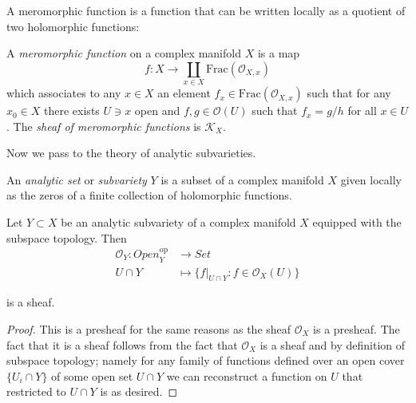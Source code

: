 \medskip\noindent
A meromorphic function is a function that
can be written locally as a quotient of two
holomorphic functions:

\begin{definition}
\label{definition-meromorphic-functions}
\begin{reference}
\cite[Definition 2.1.8]{huc}
\end{reference}
A {\it meromorphic function} on a complex manifold $X$ 
is a map
$$
f:X \to \coprod_{x \in X}\text{Frac}(\mathcal{O}_{X,x})
$$
which associates to any $x\in X$
an element $f_x \in \text{Frac}(\mathcal{O}_{X,x})$
such that for any $x_0 \in X$ 
there exists $U\ni x$ open and $f,g \in\mathcal{O}(U)$ 
such that $f_x=g/h$ for all $x \in U$.
The {\it sheaf of meromorphic functions} is $\mathcal{K}_X$.
\end{definition}


\medskip\noindent
Now we pass to the theory of analytic subvarieties.

\begin{definition}
\label{definition-analytic-subvariety}
\begin{reference}

\end{reference}
An {\it analytic set} or {\it subvariety} $Y$ 
is a subset of a complex manifold $X$
given locally as the zeros of a finite collection of holomorphic functions.
\end{definition}

\begin{lemma}
\label{lemma-structure-sheaf-of-subvariety}
Let $Y \subset X$ be an analytic subvariety
of a complex manifold $X$
equipped with the subspace topology.
Then
\begin{align*}
\mathcal{O}_Y: \mathit{Open}_Y^{\text{op}} &\longrightarrow \mathit{Set} \\
U\cap Y &\longmapsto \{f|_{U \cap Y}:f \in \mathcal{O}_X(U)\}
\end{align*}

\noindent
is a sheaf.
\end{lemma}

\begin{proof}
This is a presheaf for the same reasons as
the sheaf $\mathcal{O}_X$ is a presheaf.
The fact that it is a sheaf follows
from the fact that $\mathcal{O}_X$ is a 
sheaf and by definition of subspace topology;
namely for any family of functions
defined over an open cover $\{U_i \cap Y\}$
of some open set  $U\cap Y$ we can reconstruct a function
on $U$ that restricted to $U \cap Y$ is as desired.
\end{proof}

